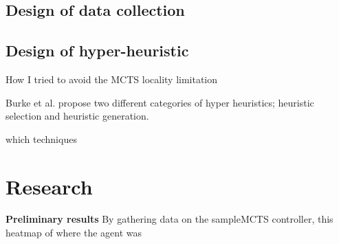 \documentclass[journal]{IEEEtran}
\begin{document}
	


	\subsection{Design of data collection}
	
	\subsection{Design of hyper-heuristic}
	How I tried to avoid the MCTS locality limitation
	
	Burke et al. propose two different categories of hyper heuristics; heuristic selection and heuristic generation\cite{burke2010classification}.




which techniques 










	
\section{Research}
	\textbf{Preliminary results}
		By gathering data on the sampleMCTS controller, this heatmap of where the agent was 


	 







\end{document}
